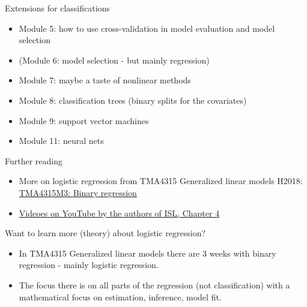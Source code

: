 \documentclass[10pt,ignorenonframetext,]{beamer}
\providecommand{\tightlist}{%
  \setlength{\itemsep}{0pt}\setlength{\parskip}{0pt}}
\begin{document}
\begin{frame}

\begin{block}{Extensions for classifications}

\begin{itemize}
\tightlist
\item
  Module 5: how to use cross-validation in model evaluation and model
  selection
\item
  (Module 6: model selection - but mainly regression)
\item
  Module 7: maybe a taste of nonlinear methods
\item
  Module 8: classification trees (binary splits for the covariates)
\item
  Module 9: support vector machines
\item
  Module 11: neural nets
\end{itemize}

\end{block}

\end{frame}

\begin{frame}{ Further reading }

\begin{itemize}
\tightlist
\item
  More on logistic regression from TMA4315 Generalized linear models
  H2018:
  \href{https://www.math.ntnu.no/emner/TMA4315/2018h/3BinReg.html}{TMA4315M3:
  Binary regression}
\item
  \href{https://www.youtube.com/playlist?list=PL5-da3qGB5IC4vaDba5ClatUmFppXLAhE}{Videoes
  on YouTube by the authors of ISL, Chapter 4}
\end{itemize}

\end{frame}

\begin{frame}

\begin{block}{Want to learn more (theory) about logistic regression?}

\begin{itemize}
\item
  In TMA4315 Generalized linear models there are 3 weeks with binary
  regression - mainly logistic regression.
\item
  The focus there is on all parts of the regression (not classification)
  with a mathematical focus on estimation, inference, model fit.
\end{itemize}

\end{block}

\end{frame}
\end{document}
